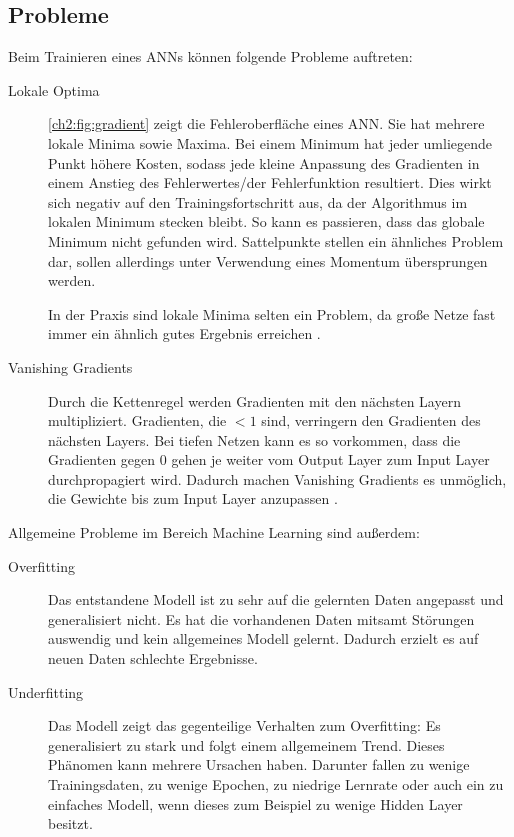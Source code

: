 \subsection{Probleme}
Beim Trainieren eines \ac{ANN}s können folgende Probleme auftreten:
\begin{description}
    \item[Lokale Optima] 
    \autoref{ch2:fig:gradient} zeigt die Fehleroberfläche eines \ac{ANN}.
    Sie hat mehrere lokale Minima sowie Maxima.
    Bei einem Minimum hat jeder umliegende Punkt höhere Kosten, sodass jede kleine Anpassung des Gradienten in einem Anstieg des Fehlerwertes/der Fehlerfunktion resultiert. Dies wirkt sich negativ auf den Trainingsfortschritt aus, da der Algorithmus im lokalen Minimum stecken bleibt.
    So kann es passieren, dass das globale Minimum nicht gefunden wird.
    Sattelpunkte stellen ein ähnliches Problem dar, sollen allerdings unter Verwendung eines Momentum übersprungen werden.

    In der Praxis sind lokale Minima selten ein Problem, da große Netze fast immer ein ähnlich gutes Ergebnis erreichen \cite{lecun_deep_2015}.

    \item[Vanishing Gradients] 
    Durch die Kettenregel werden Gradienten mit den nächsten Layern multipliziert.
    Gradienten, die $<1$ sind, verringern den Gradienten des nächsten Layers.
    Bei tiefen Netzen kann es so vorkommen, dass die Gradienten gegen $0$ gehen je weiter vom Output Layer zum Input Layer durchpropagiert wird. 
    Dadurch machen Vanishing Gradients es unmöglich, die Gewichte bis zum Input Layer anzupassen \cite{goodfellow_deep_2016}.
\end{description}

Allgemeine Probleme im Bereich Machine Learning sind außerdem:
\begin{description}
    \item[Overfitting]
    Das entstandene Modell ist zu sehr auf die gelernten Daten angepasst und generalisiert nicht.
    Es hat die vorhandenen Daten mitsamt Störungen auswendig und kein allgemeines Modell gelernt.
    Dadurch erzielt es auf neuen Daten schlechte Ergebnisse.

    \item[Underfitting]
    Das Modell zeigt das gegenteilige Verhalten zum Overfitting: Es generalisiert zu stark und folgt einem allgemeinem Trend.
    Dieses Phänomen kann mehrere Ursachen haben.
    Darunter fallen zu wenige Trainingsdaten, zu wenige Epochen, zu niedrige Lernrate oder auch ein zu einfaches Modell, wenn dieses zum Beispiel zu wenige Hidden Layer besitzt.
\end{description}

